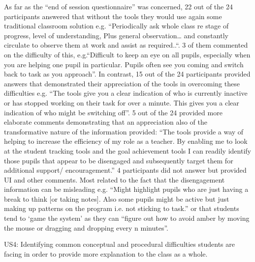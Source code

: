 As far as the “end of session questionnaire” was concerned, 22 out of
the 24 participants answered that without the tools they would use
again some traditional classroom solution e.g. “Periodically ask whole
class re stage of progress, level of understanding, Plus general
observation… and constantly circulate to observe them at work and
assist as required..“. 3 of them commented on the difficulty of this,
e.g.“Difficult to keep an eye on all pupils, especially when you are
helping one pupil in particular. Pupils often see you coming and
switch back to task as you approach”. In contrast, 15 out of the 24
participants provided answers that demonstrated their appreciation of
the tools in overcoming these difficulties e.g. “The tools give you a
clear indication of who is currently inactive or has stopped working
on their task for over a minute. This gives you a clear indication of
who might be switching off”. 5 out of the 24 provided more elaborate
comments demonstrating that an appreciation also of the transformative
nature of the information provided: “The tools provide a way of
helping to increase the efficiency of my role as a teacher. By
enabling me to look at the student tracking tools and the goal
achievement tools I can readily identify those pupils that appear to
be disengaged and subsequently target them for additional support/
encouragement.” 4 participants did not answer but provided UI and
other comments. Most related to the fact that the disengagement
information can be misleading e.g. “Might highlight pupils who are
just having a break to think [or taking notes]. Also some pupils might
be active but just making up patterns on the program i.e. not sticking
to task.” or that students tend to ‘game the system’ as they can “figure out how to avoid amber by moving the mouse or dragging and dropping every n minutes”.  

US4: Identifying common conceptual and procedural difficulties
students are facing in order to provide more explanation to the class
as a whole. 

